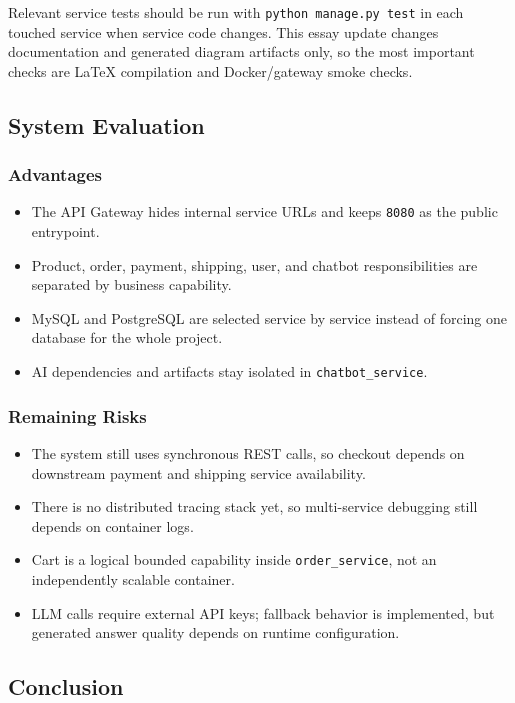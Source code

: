 \documentclass[12pt,a4paper]{article}
\newcommand{\codepath}[1]{{\small\texttt{#1}}}
\begin{document}
Relevant service tests should be run with \codepath{python manage.py test} in each touched service when service code changes. This essay update changes documentation and generated diagram artifacts only, so the most important checks are LaTeX compilation and Docker/gateway smoke checks.

\subsection{System Evaluation}

\subsubsection{Advantages}

\begin{itemize}
    \item The API Gateway hides internal service URLs and keeps \codepath{8080} as the public entrypoint.
    \item Product, order, payment, shipping, user, and chatbot responsibilities are separated by business capability.
    \item MySQL and PostgreSQL are selected service by service instead of forcing one database for the whole project.
    \item AI dependencies and artifacts stay isolated in \codepath{chatbot\_service}.
\end{itemize}

\subsubsection{Remaining Risks}

\begin{itemize}
    \item The system still uses synchronous REST calls, so checkout depends on downstream payment and shipping service availability.
    \item There is no distributed tracing stack yet, so multi-service debugging still depends on container logs.
    \item Cart is a logical bounded capability inside \codepath{order\_service}, not an independently scalable container.
    \item LLM calls require external API keys; fallback behavior is implemented, but generated answer quality depends on runtime configuration.
\end{itemize}

\subsection{Conclusion}
\end{document}
